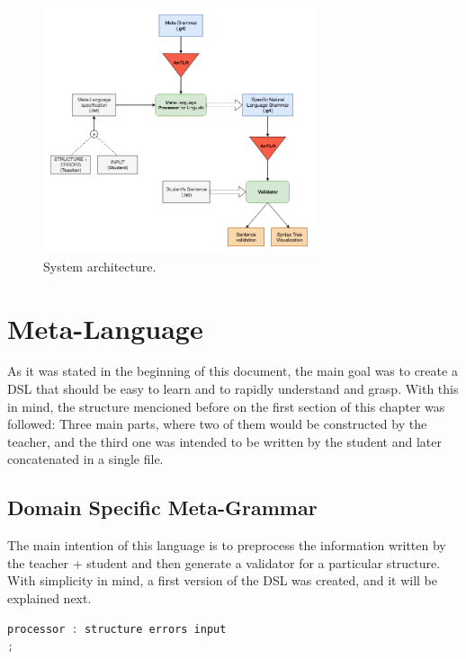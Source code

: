 \begin{figure}[h]
    \centering
    \includegraphics[width=8cm]{images/msc_system_architecture.png}
    \caption{System architecture.}
    \label{fig:system_architecture}
\end{figure}

\section{Meta-Language}
As it was stated in the beginning of this document, the main goal was to create a \textsc{DSL} that should be easy to learn and to rapidly understand and grasp. With this in mind, the structure mencioned before on the first section
of this chapter was followed: Three main parts, where two of them would be constructed by the teacher, and the third one was intended to be written by the student and later concatenated in a single file.

\subsection{Domain Specific Meta-Grammar}
The main intention of this language is to preprocess the information written by the teacher + student and then generate a validator for a particular structure. With simplicity in mind, a first version of the \textsc{DSL} was created, and it will be explained next.

\begin{center}
\begin{minipage}{8cm}
\begin{lstlisting}[language=java, basicstyle=\small, label={lst:processor_prod}, caption=Processor production]
processor : structure errors input
;
\end{lstlisting}
\end{minipage}
\end{center}


